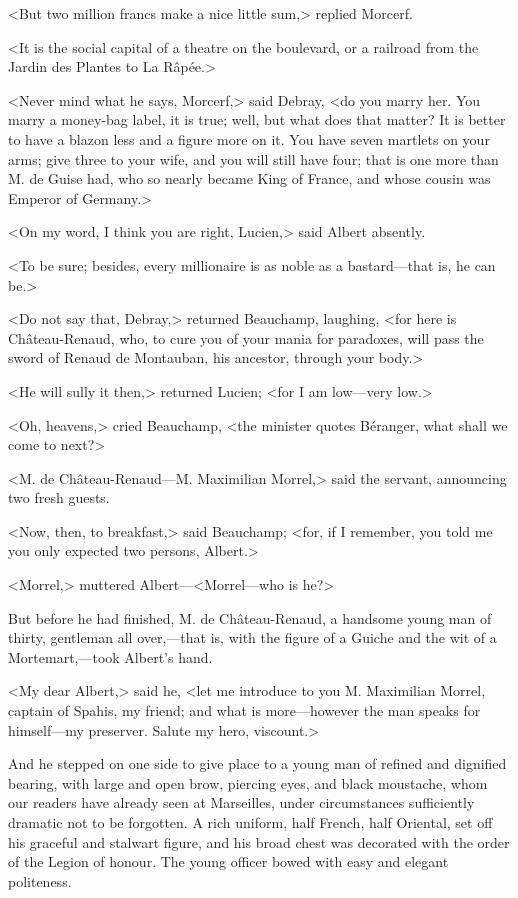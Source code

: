  <But two million francs make a nice little sum,> replied Morcerf. 

 <It is the social capital of a theatre on the boulevard, or a railroad from the Jardin des Plantes to La Râpée.> 

 <Never mind what he says, Morcerf,> said Debray, <do you marry her. You marry a money-bag label, it is true; well, but what does that matter? It is better to have a blazon less and a figure more on it. You have seven martlets on your arms; give three to your wife, and you will still have four; that is one more than M. de Guise had, who so nearly became King of France, and whose cousin was Emperor of Germany.> 

 <On my word, I think you are right, Lucien,> said Albert absently. 

 <To be sure; besides, every millionaire is as noble as a bastard—that is, he can be.> 

 <Do not say that, Debray,> returned Beauchamp, laughing, <for here is Château-Renaud, who, to cure you of your mania for paradoxes, will pass the sword of Renaud de Montauban, his ancestor, through your body.> 

 <He will sully it then,> returned Lucien; <for I am low—very low.> 

 <Oh, heavens,> cried Beauchamp, <the minister quotes Béranger, what shall we come to next?> 

 <M. de Château-Renaud—M. Maximilian Morrel,> said the servant, announcing two fresh guests. 

 <Now, then, to breakfast,> said Beauchamp; <for, if I remember, you told me you only expected two persons, Albert.> 

 <Morrel,> muttered Albert—<Morrel—who is he?> 

 But before he had finished, M. de Château-Renaud, a handsome young man of thirty, gentleman all over,—that is, with the figure of a Guiche and the wit of a Mortemart,—took Albert's hand. 

 <My dear Albert,> said he, <let me introduce to you M. Maximilian Morrel, captain of Spahis, my friend; and what is more—however the man speaks for himself—my preserver. Salute my hero, viscount.> 

 And he stepped on one side to give place to a young man of refined and dignified bearing, with large and open brow, piercing eyes, and black moustache, whom our readers have already seen at Marseilles, under circumstances sufficiently dramatic not to be forgotten. A rich uniform, half French, half Oriental, set off his graceful and stalwart figure, and his broad chest was decorated with the order of the Legion of honour. The young officer bowed with easy and elegant politeness. 

